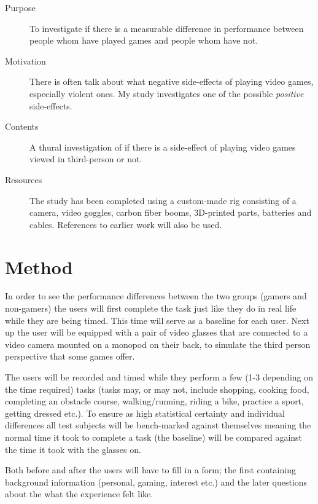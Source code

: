 \documentclass[runningheads,a4paper,oribibl]{llncs}
\begin{document}
\begin{description}
   \item[Purpose] To investigate if there is a measurable difference in performance between people whom have played games and people whom have not.
   \item[Motivation] There is often talk about what negative side-effects of playing video games, especially violent ones. My study investigates one of the possible \emph{positive} side-effects.
   \item[Contents] A thural investigation of if there is a side-effect of playing video games viewed in third-person or not.
   \item[Resources] The study has been completed using a custom-made rig consisting of a camera, video goggles, carbon fiber booms, 3D-printed parts, batteries and cables. References to earlier work will also be used.
\end{description}








\section{Method}
In order to see the performance differences between the two groups (gamers and non-gamers) the users will first complete the task just like they do in real life while they are being timed. This time will serve as a baseline for each user. Next up the user will be equipped with a pair of video glasses that are connected to a video camera mounted on a monopod on their back, to simulate the third person perspective that some games offer. 

The users will be recorded and timed while they perform a few (1-3 depending on the time required) tasks (tasks may, or may not, include shopping, cooking food, completing an obstacle course, walking/running, riding a bike, practice a sport, getting dressed etc.). To ensure as high statistical certainty and individual differences all test subjects will be bench-marked against themselves meaning the normal time it took to complete a task (the baseline) will be compared against the time it took with the glasses on.

Both before and after the users will have to fill in a form; the first containing background information (personal, gaming, interest etc.) and the later questions about the what the experience felt like.
\end{document}
